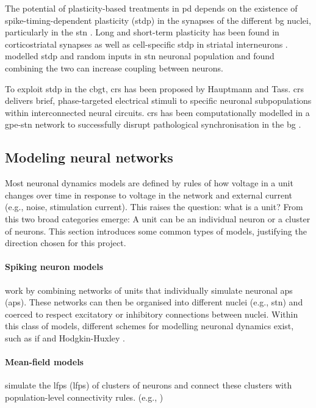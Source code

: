 The potential of plasticity-based treatments in \acrshort{pd} depends on the existence of
spike-timing-dependent plasticity (\acrshort{stdp}) in the synapses of the different \acrshort{bg} nuclei, particularly
in the \acrshort{stn} \cite{rubin2012basal}. Long and short-term plasticity has been found in
corticostriatal synapses \cite{kreitzer2008striatal, di2009short} as well as cell-specific \acrshort{stdp} in
striatal interneurons \cite{fino2010spike}.
\cite{thieu2024role} modelled \acrshort{stdp} and random inputs in \acrshort{stn} neuronal population and found combining the two can
increase coupling between neurons.

To exploit \acrshort{stdp} in the \acrshort{cbgt}, \acrfull{crs} has been proposed by Hauptmann and Tass.
\acrshort{crs} delivers brief, phase-targeted electrical stimuli to specific neuronal subpopulations within interconnected
neural circuits.
\acrshort{crs} has been computationally modelled in a \acrfull{gpe}-\acrshort{stn} network to successfully disrupt pathological
synchronisation in the \acrshort{bg} \cite{hauptmann2009cumulative, hauptmann2010restoration}.

\subsection{Modeling neural networks}
Most neuronal dynamics models are defined by rules of how voltage in a unit changes
over time in response to voltage in the network and external current (e.g., noise, stimulation
current).
This raises the question: what is a unit? From this two broad categories emerge: A unit can be an individual neuron or a cluster of neurons. This section introduces
some common types of models, justifying the direction chosen for this project.

\paragraph{Spiking neuron models} work by combining networks of units that individually
simulate neuronal \acrlong{ap}s (\acrshort{ap}s).
These networks can then be organised into different nuclei (e.g., \acrshort{stn}) and coerced to respect
excitatory or inhibitory connections between nuclei.
Within this class of models, different schemes for modelling neuronal dynamics exist,
such as \acrfull{if} \cite{gerstner2014if} and Hodgkin-Huxley
\cite{hodgkin1952measurement, gerstner2014hh}.

\paragraph{Mean-field models} simulate the \acrlong{lfp}s (\acrshort{lfp}s) of clusters of neurons
and connect these clusters with population-level connectivity rules. (e.g.,
\cite{jansen1995electroencephalogram, west2022stimulating})

